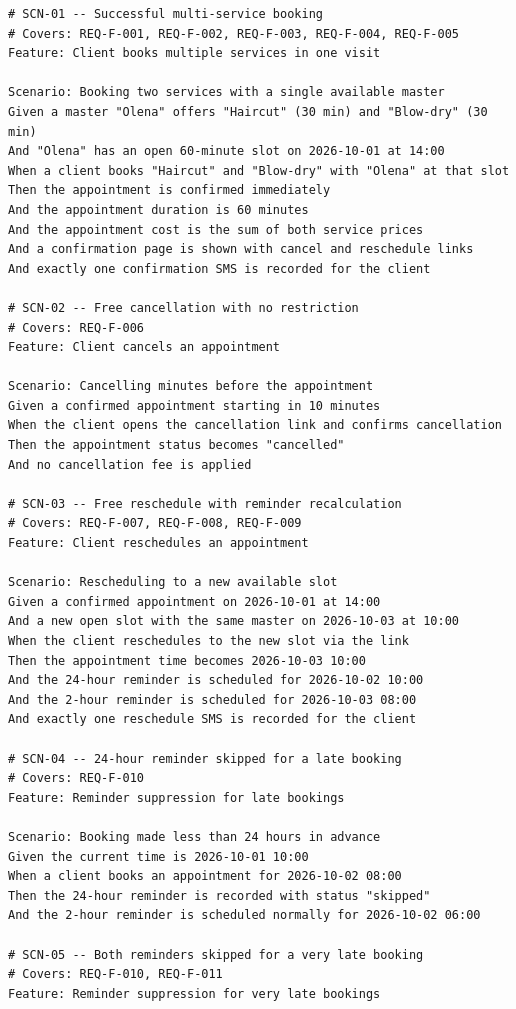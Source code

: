 \documentclass[11pt,a4paper]{article}
\begin{document}
\begin{lstlisting}
# SCN-01 -- Successful multi-service booking
# Covers: REQ-F-001, REQ-F-002, REQ-F-003, REQ-F-004, REQ-F-005
Feature: Client books multiple services in one visit

Scenario: Booking two services with a single available master
Given a master "Olena" offers "Haircut" (30 min) and "Blow-dry" (30 min)
And "Olena" has an open 60-minute slot on 2026-10-01 at 14:00
When a client books "Haircut" and "Blow-dry" with "Olena" at that slot
Then the appointment is confirmed immediately
And the appointment duration is 60 minutes
And the appointment cost is the sum of both service prices
And a confirmation page is shown with cancel and reschedule links
And exactly one confirmation SMS is recorded for the client

# SCN-02 -- Free cancellation with no restriction
# Covers: REQ-F-006
Feature: Client cancels an appointment

Scenario: Cancelling minutes before the appointment
Given a confirmed appointment starting in 10 minutes
When the client opens the cancellation link and confirms cancellation
Then the appointment status becomes "cancelled"
And no cancellation fee is applied

# SCN-03 -- Free reschedule with reminder recalculation
# Covers: REQ-F-007, REQ-F-008, REQ-F-009
Feature: Client reschedules an appointment

Scenario: Rescheduling to a new available slot
Given a confirmed appointment on 2026-10-01 at 14:00
And a new open slot with the same master on 2026-10-03 at 10:00
When the client reschedules to the new slot via the link
Then the appointment time becomes 2026-10-03 10:00
And the 24-hour reminder is scheduled for 2026-10-02 10:00
And the 2-hour reminder is scheduled for 2026-10-03 08:00
And exactly one reschedule SMS is recorded for the client

# SCN-04 -- 24-hour reminder skipped for a late booking
# Covers: REQ-F-010
Feature: Reminder suppression for late bookings

Scenario: Booking made less than 24 hours in advance
Given the current time is 2026-10-01 10:00
When a client books an appointment for 2026-10-02 08:00
Then the 24-hour reminder is recorded with status "skipped"
And the 2-hour reminder is scheduled normally for 2026-10-02 06:00

# SCN-05 -- Both reminders skipped for a very late booking
# Covers: REQ-F-010, REQ-F-011
Feature: Reminder suppression for very late bookings


\end{lstlisting}
\end{document}
